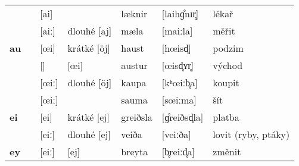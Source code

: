\begin{longtable}{>{\bfseries}lX>{\IPAfont}lXl>{\IPAfont}ll}
 &  & {[ai]} &  & læknir & {[laihɡ̊nɪr̥]} & lékař \\ 
 &  & {[aiː]} & dlouhé [aj] & mæla & {[maiːla]} & měřit \\ 
au &  & {[\oe i]} & krátké [öj] & haust & {[h\oe isd̥]} & podzim \\ 
 &  & {[]} & [œi] & austur & {[\oe isd̥ʏr̥]} & východ \\ 
 &  & {[\oe iː]} & dlouhé [öj] & kaupa & {[kʰ\oe iːb̥a]} & koupit \\ 
 &  & {[\oe iː]} &  & sauma & {[s\oe iːma]} & šít \\ 
ei &  & {[ei]} & krátké [ej] & greiðsla & {[ɡ̊reiðsd̥la]} & platba \\ 
 &  & {[eiː]} & dlouhé [ej] & veiða & {[veiːða]} & lovit (ryby, ptáky) \\ 
ey &  & {[eiː]} & [ej] & breyta & {[b̥reiːd̥a]} & změnit \\ 
\bottomrule
\end{longtable}
